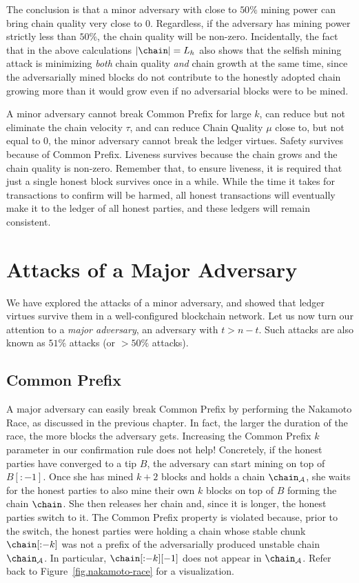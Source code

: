The conclusion is that a minor adversary with close to $50\%$ mining power can bring
chain quality very close to $0$. Regardless, if the adversary has mining power strictly
less than $50\%$, the chain quality will be non-zero.
Incidentally, the fact that in the above calculations
$|\chain| = L_h$ also shows that the selfish mining attack is minimizing \emph{both}
chain quality \emph{and} chain growth at the same time, since the adversarially mined
blocks do not contribute to the honestly adopted chain growing more than it would
grow even if no adversarial blocks were to be mined.

A minor adversary cannot break Common Prefix for large $k$, can reduce but not eliminate the chain velocity
$\tau$, and can reduce Chain Quality $\mu$ close to, but not equal to $0$, the minor adversary cannot
break the ledger virtues. Safety survives because of Common Prefix. Liveness survives because the chain grows
and the chain quality is non-zero. Remember that, to ensure liveness, it is required that just a single honest
block survives once in a while. While the time it takes for transactions to confirm will be harmed, all honest
transactions will eventually make it to the ledger of all honest parties, and these ledgers will remain
consistent.

\section{Attacks of a Major Adversary}
We have explored the attacks of a minor adversary, and showed that ledger virtues survive them in a
well-configured blockchain network. Let us now turn our attention to a \emph{major adversary}, an
adversary with $t > n - t$. Such attacks are also known as $51\%$ attacks (or $> 50\%$ attacks).

\subsection*{Common Prefix}
A major adversary can easily break Common Prefix by performing the Nakamoto Race, as discussed
in the previous chapter. In fact, the larger the duration of the race, the more blocks the adversary
gets. Increasing the Common Prefix $k$ parameter in our confirmation rule does not help!
Concretely,
if the honest parties have converged to a tip $B$, the adversary can start mining on top of
$B[{:}{-1}]$. Once she has mined $k + 2$ blocks and holds a chain $\chain_\mathcal{A}$,
she waits for the honest parties to also mine their own $k$ blocks on top of $B$
forming the chain $\chain$.
She then releases her chain and, since it is longer, the honest parties switch to it.
The Common Prefix property is violated because, prior to the switch, the honest parties
were holding a chain whose stable chunk $\chain[{:}{-k}]$ was not a prefix of the
adversarially produced unstable chain $\chain_\mathcal{A}$. In particular,
$\chain[{:}{-k}][-1]$ does not appear in $\chain_\mathcal{A}$. Refer back to
Figure~\ref{fig.nakamoto-race}
for a visualization.

